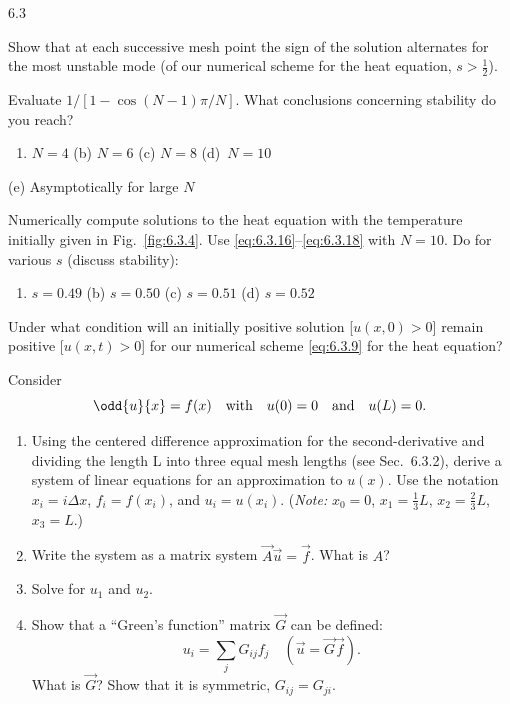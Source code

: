 \begin{exercises}{6.3}
\item Show that at each successive mesh point the sign of the solution alternates for the most unstable mode (of our numerical scheme for the heat equation, $s > \frac{1}{2}$).

\item Evaluate $1/[1 - \cos(N-1)\pi/N]$.  What conclusions concerning stability do you reach?
\begin{enumerate}
\item[(a)] $N = 4$ \qquad (b) $N = 6$ \qquad (c) $N = 8$ \qquad \starred (d)~$N = 10$
\end{enumerate}
(e) Asymptotically for large $N$

\item Numerically compute solutions to the heat equation with the temperature initially given in Fig.~\ref{fig:6.3.4}.  Use \eqref{eq:6.3.16}--\eqref{eq:6.3.18} with $N = 10$.  Do for various $s$ (discuss stability):
\begin{enumerate}
\item[(a)] $s = 0.49$ \qquad (b) $s = 0.50$ \qquad (c) $s = 0.51$ \qquad (d) $s = 0.52$
\end{enumerate}

\item Under what condition will an initially positive solution [$u(x,0) > 0$] remain positive [$u(x,t) > 0$] for our numerical scheme \eqref{eq:6.3.9} for the heat equation?

\item Consider
\[
\odd{u}{x} = f(x) \quad\text{with}\quad u(0) = 0 \quad\text{and}\quad u(L) = 0.
\]
\begin{enumerate}
\item[(a)] Using the centered difference approximation for the second-derivative and dividing the length L into three equal mesh lengths (see Sec.~6.3.2), derive a system of linear equations for an approximation to $u(x)$.  Use the notation $x_i = i\Delta x$, $f_i = f(x_i)$, and $u_i = u(x_i)$.  (\emph{Note:} $x_0 = 0$, $x_1 = \frac{1}{3}L$, $x_2 = \frac{2}{3}L$, $x_3 = L$.)
\item[\starred (b)] Write the system as a matrix system $\vec{A}\vec{u} = \vec{f}$.  What is $A$?
\item[(c)] Solve for $u_1$ and $u_2$.
\item[(d)] Show that a ``Green's function'' matrix $\vec{G}$ can be defined:
\[
u_i = \sum_j G_{ij}f_j \quad (\vec{u} = \vec{G}\vec{f}).
\]
What is $\vec{G}$?  Show that it is symmetric, $G_{ij} = G_{ji}$.
\end{enumerate}


\end{exercises}
